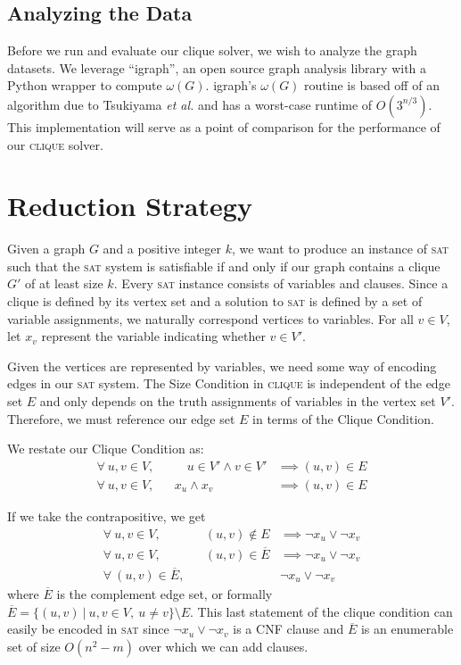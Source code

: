 \documentclass[]{article}
\newcommand{\clique}{\textsc{clique}}
\newcommand{\sat}{\textsc{sat}}
\begin{document}
	\subsection{Analyzing the Data}
	Before we run and evaluate our clique solver, we wish to analyze the graph datasets. We leverage ``igraph'', an open source graph analysis library with a Python wrapper to compute $\omega(G)$. igraph's $\omega(G)$ routine is based off of an algorithm due to Tsukiyama \textit{et al.}\cite{doi:10.1137/0206036} and has a worst-case runtime of $O\left(3^{n/3}\right)$\cite{igraph2016}. This implementation will serve as a point of comparison for the performance of our \clique{} solver.
	
	\section{Reduction Strategy}
	Given a graph $G$ and a positive integer $k$, we want to produce an instance of \sat{} such that the \sat{} system is satisfiable if and only if our graph contains a clique $G'$ of at least size $k$. Every \sat{} instance consists of variables and clauses. Since a clique is defined by its vertex set and a solution to \sat{} is defined by a set of variable assignments, we naturally correspond vertices to variables. For all $v \in V$, let $x_v$ represent the variable indicating whether $v \in V'$.
	 
	Given the vertices are represented by variables, we need some way of encoding edges in our \sat{} system. The Size Condition in \clique{} is independent of the edge set $E$ and only depends on the truth assignments of variables in the vertex set $V'$. Therefore, we must reference our edge set $E$ in terms of the Clique Condition.
	
	We restate our Clique Condition as:
	\begin{align}
	\forall~u,v \in V,&& \quad u \in V' \land v \in V' &\implies (u, v) \in E \\
	\forall~u,v \in V,&& x_u \land x_v &\implies (u, v) \in E
	\end{align}
	
	If we take the contrapositive, we get
	\begin{align}
	\forall~u,v \in V,&& (u, v) \notin E &\implies \lnot x_u \lor \lnot x_v \\
	\forall~u,v \in V,&& (u, v) \in \overline{E} &\implies \lnot x_u \lor \lnot x_v\\
	\forall~ (u, v) \in \overline{E},&& &\lnot x_u \lor \lnot x_v
	\end{align}
	where $\overline{E}$ is the complement edge set, or formally $\overline{E} = \{(u, v) ~\vert~ u, v \in V,~u \neq v\} \setminus E$. This last statement of the clique condition can easily be encoded in \sat{} since $\lnot x_u \lor \lnot x_v$ is a CNF clause and $\overline{E}$ is an enumerable set of size $O(n^2 - m)$ over which we can add clauses.
	
\end{document}
